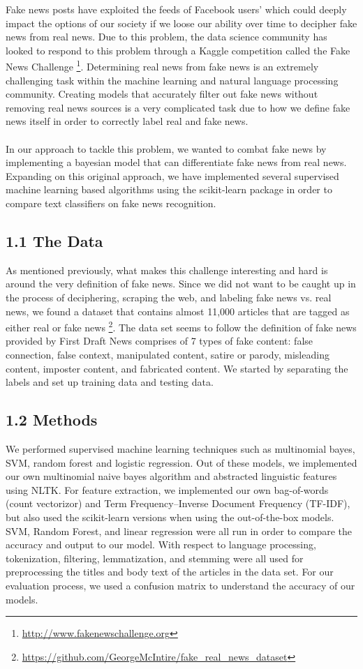 \documentclass{neu_handout}
\begin{document}
Fake news posts have exploited the feeds of Facebook users' which could deeply impact the options of our society if we loose our ability over time to decipher fake news from real news. Due to this problem, the data science community has looked to respond to this problem through a Kaggle competition called the Fake News Challenge \footnote{\url{http://www.fakenewschallenge.org}}. Determining real news from fake news is an extremely challenging task within the machine learning and natural language processing community. Creating models that accurately filter out fake news without removing real news sources is a very complicated task due to how we define fake news itself in order to correctly label real and fake news.\\\\

In our approach to tackle this problem, we wanted to combat fake news by implementing a bayesian model that can differentiate fake news from real news. Expanding on this original approach, we have implemented several supervised machine learning based algorithms using the scikit-learn package in order to compare text classifiers on fake news recognition. 


\subsection*{1.1 The Data}
As mentioned previously, what makes this challenge interesting and hard is around the very definition of fake news. Since we did not want to be caught up in the process of deciphering, scraping the web, and labeling fake news vs. real news, we found a dataset that contains almost 11,000 articles that are tagged as either real or fake news \footnote{\url{https://github.com/GeorgeMcIntire/fake_real_news_dataset}}. The data set seems to follow the definition of fake news provided by First Draft News comprises of 7 types of fake content: false connection, false context, manipulated content, satire or parody, misleading content, imposter content, and fabricated content. We started by separating the labels and set up training data and testing data.


\subsection*{1.2 Methods}
We performed supervised machine learning techniques such as multinomial bayes, SVM, random forest and logistic regression. Out of these models, we implemented our own multinomial naive bayes algorithm and abstracted linguistic features using NLTK. For feature extraction, we implemented our own bag-of-words (count vectorizor) and Term Frequency–Inverse Document Frequency (TF-IDF), but also used the scikit-learn versions when using the out-of-the-box models. SVM, Random Forest, and linear regression were all run in order to compare the accuracy and output to our model. With respect to language processing, tokenization, filtering, lemmatization, and stemming were all used for preprocessing the titles and body text of the articles in the data set. For our evaluation process, we used a confusion matrix to understand the accuracy of our models.
\end{document}
